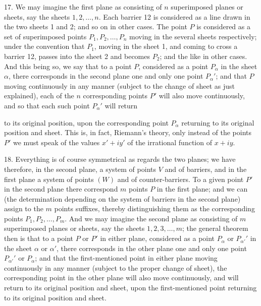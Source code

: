 \documentclass[11pt,a4paper]{article}
\begin{document}
\medskip

17. We may imagine the first plane as consisting of $n$ superimposed planes or sheets, say the sheets $1, 2, \ldots, n$. Each barrier 12 is considered as a line drawn in the two sheets 1 and 2; and so on in other cases. The point $P$ is considered as a set of superimposed points $P_{1}, P_{2}, \ldots, P_{n}$ moving in the several sheets respectively; under the convention that $P_{1}$, moving in the sheet 1, and coming to cross a barrier 12, passes into the sheet 2 and becomes $P_{2}$; and the like in other cases. And this being so, we say that to a point $P$, considered as a point $P_{\alpha}$ in the sheet $\alpha$, there corresponds in the second plane one and only one point $P_{\alpha}'$; and that $P$ moving continuously in any manner (subject to the change of sheet as just explained), each of the $n$ corresponding points $P'$ will also move continuously, and so that each such point $P_{\alpha}'$ will return

\newpage


\noindent to its original position, upon the corresponding point $P_{\alpha}$ returning to its original position and sheet. This is, in fact, Riemann's theory, only instead of the points $P'$ we must speak of the values $x' + iy'$ of the irrational function of $x + iy$.

\medskip

18. Everything is of course symmetrical as regards the two planes; we have therefore, in the second plane, a system of points $V$ and of barriers, and in the first plane a system of points $(W)$ and of counter-barriers. To a given point $P'$ in the second plane there correspond $m$ points $P$ in the first plane; and we can (the determination depending on the system of barriers in the second plane) assign to the $m$ points suffixes, thereby distinguishing them as the corresponding points $P_{1}, P_{2}, \ldots, P_{m}$. And we may imagine the second plane as consisting of $m$ superimposed planes or sheets, say the sheets $1, 2, 3, \ldots, m$; the general theorem then is that to a point $P$ or $P'$ in either plane, considered as a point $P_{\alpha}$ or $P_{\alpha'}'$ in the sheet $\alpha$ or $\alpha'$, there corresponds in the other plane one and only one point $P_{\alpha'}'$ or $P_{\alpha}$; and that the first-mentioned point in either plane moving continuously in any manner (subject to the proper change of sheet), the corresponding point in the other plane will also move continuously, and will return to its original position and sheet, upon the first-mentioned point returning to its original position and sheet.
\end{document}

